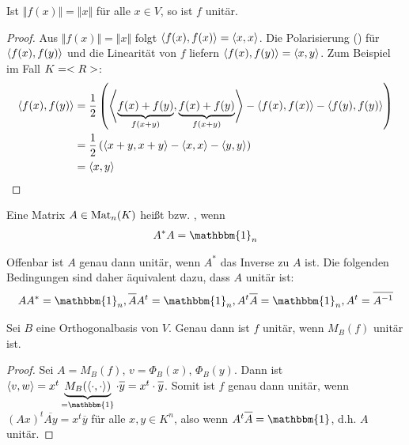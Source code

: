 \begin{proposition}
	Ist $\Vert f(x)\Vert=\Vert x\Vert$ für alle $x\in V$, so ist $f$ unitär.
\end{proposition}
\begin{proof}
	Aus $\Vert f(x)\Vert=\Vert x\Vert$ folgt $\left\langle f(x),f(x)\right\rangle=\left\langle x,x\right\rangle$. Die Polarisierung () für $\left\langle f(x),f(y)\right\rangle$ und die Linearität von $f$ liefern $\left\langle f(x),f(y)\right\rangle=\left\langle x,y\right\rangle$. Zum Beispiel im Fall $K=<R>$:
	\begin{align}
		\left\langle f(x),f(y)\right\rangle&=\frac 1 2 \left(\left\langle \underbrace{f(x)+f(y)}_{f(x+y)},\underbrace{f(x)+f(y)}_{f(x+y)}\right\rangle-\left\langle f(x),f(x)\right\rangle-\left\langle f(y),f(y)\right\rangle\right) \notag \\
		&= \frac 1 2 \left( \left\langle x+y,x+y\right\rangle-\left\langle x,x\right\rangle-\left\langle y,y\right\rangle\right) \notag \\
		&= \left\langle x,y\right\rangle\notag
	\end{align}
\end{proof}

\begin{definition}
	Eine Matrix $A\in\operatorname{Mat}_n(K)$ heißt  bzw. , wenn
	\begin{align}
		A^*A=\mathbbm{1}_n\notag
	\end{align}
\end{definition}

\begin{remark}
	Offenbar ist $A$ genau dann unitär, wenn $A^*$ das Inverse zu $A$ ist. Die folgenden Bedingungen sind daher äquivalent dazu, dass $A$ unitär ist:
	\begin{align}
		AA^*=\mathbbm{1}_n, \overline{A}A^t=\mathbbm{1}_n,  A^t\overline{A}=\mathbbm{1}_n,  A^t=\overline{A^{-1}}\notag
	\end{align}
\end{remark}

\begin{proposition}
	Sei $B$ eine Orthogonalbasis von $V$. Genau dann ist $f$ unitär, wenn $M_B(f)$ unitär ist.
\end{proposition}
\begin{proof}
	Sei $A=M_B(f)$, $v=\Phi_B(x)$, $\Phi_B(y)$. Dann ist $\skalar{v}{w}=x^t\underbrace{M_B(\skalar{\cdot}{\cdot})}_{=\mathbbm{1}}\cdot \overline{y}=x^t\cdot \overline{y}$. Somit ist $f$ genau dann unitär, wenn $(Ax)^t\overline{Ay}=x^t\overline{y}$ für alle $x,y\in K^n$, also wenn $A^t\overline{A}=\mathbbm{1}$, d.h. $A$ unitär.
\end{proof}

